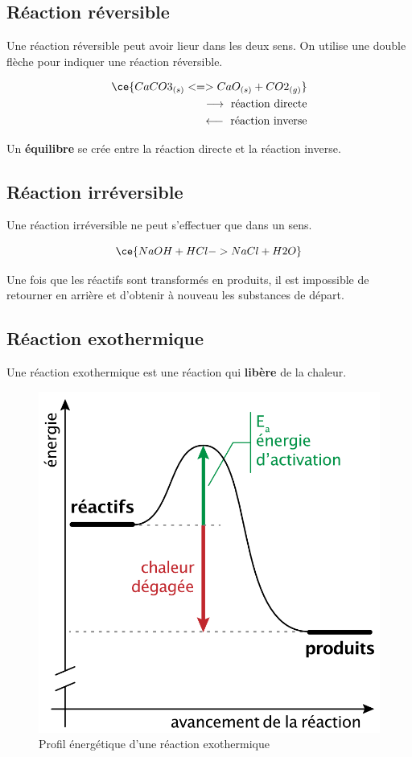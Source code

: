 \documentclass[
  11pt,
  french,
  a4paper,
  openany]{book}
\begin{document}
\hypertarget{ruxe9action-ruxe9versible}{%
\subsection{Réaction réversible}\label{ruxe9action-ruxe9versible}}

Une réaction réversible peut avoir lieur dans les deux sens. On utilise une double flèche pour indiquer une réaction réversible.

\[ \begin{split}
  \ce{ CaCO3_{(s)} <=> CaO_{(s)} + CO2_{(g)} } \\
    \longrightarrow \text{ réaction directe} \\
    \longleftarrow \text{ réaction inverse}
    \end{split} \]

Un \textbf{équilibre} se crée entre la réaction directe et la réaction inverse.

\hypertarget{ruxe9action-irruxe9versible}{%
\subsection{Réaction irréversible}\label{ruxe9action-irruxe9versible}}

Une réaction irréversible ne peut s'effectuer que dans un sens.

\[ \ce{ NaOH + HCl -> NaCl + H2O } \]

Une fois que les réactifs sont transformés en produits, il est impossible de retourner en arrière et d'obtenir à nouveau les substances de départ.

\hypertarget{ruxe9action-exothermique}{%
\subsection{Réaction exothermique}\label{ruxe9action-exothermique}}

Une réaction exothermique est une réaction qui \textbf{libère} de la chaleur.

\begin{figure}

{\centering \includegraphics[width=0.33\linewidth]{images/chaleur-1} 

}

\caption{Profil énergétique d'une réaction exothermique}\label{fig:chaleur-1}
\end{figure}
\end{document}

